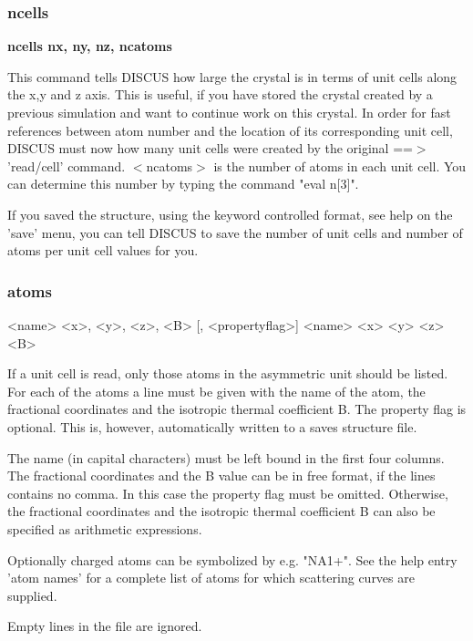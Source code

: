 \subsubsection{ncells}
{\bf ncells  nx, ny, nz, ncatoms \par }
\par
\vspace{3pt}
This command tells DISCUS how large the crystal is in terms of unit cells 
along the x,y and z axis. 
This is useful, if you have stored the crystal created by a previous 
simulation and want to continue work on this crystal. In order for 
fast references between atom number and the location of its corresponding 
unit cell, DISCUS must now how many unit cells were created by the 
original ==$> $ 'read/cell' command. 
$ <$ncatoms$> $ is the number of atoms in each unit cell. You can determine 
this number by typing the command "eval n[3]". 
\par
If you saved the structure, using the keyword controlled format, 
see help on the 'save' menu, you can tell DISCUS to save the number of 
unit cells and number of atoms per unit cell values for you. 
\subsubsection{atoms}
\begin{MacVerbatim}
<name>  <x>, <y>, <z>, <B> [, <propertyflag>]
<name>  <x>  <y>  <z>  <B>
\end{MacVerbatim}
If a unit cell is read, only those atoms in the asymmetric unit should 
be listed. 
For each of the atoms a line must be given with the name of the atom, 
the fractional coordinates and the isotropic thermal coefficient B. 
The property flag is optional. This is, however, automatically 
written to a saves structure file. 
\par
The name (in capital characters) must be left bound in the first four 
columns. 
The fractional coordinates and the B value can be in free format, if the 
lines contains no comma. In this case the property flag must be omitted. 
Otherwise, the fractional coordinates and the isotropic thermal 
coefficient B can also be specified as arithmetic expressions. 
\par
Optionally charged atoms can be symbolized by e.g. "NA1+". 
See the help entry 'atom names' for a complete list of atoms for which 
scattering curves are supplied. 
\par
Empty lines in the file are ignored. 
